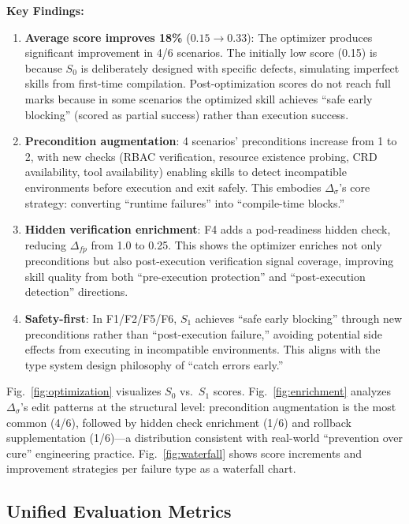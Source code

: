 \documentclass[conference,10pt]{IEEEtran}
\begin{document}
\noindent\textbf{Key Findings:}
\begin{enumerate}
  \item \textbf{Average score improves 18\%} ($0.15 \to 0.33$): The optimizer produces significant improvement in 4/6 scenarios.
  The initially low score (0.15) is because $S_0$ is deliberately designed with specific defects, simulating imperfect skills from first-time compilation.
  Post-optimization scores do not reach full marks because in some scenarios the optimized skill achieves ``safe early blocking'' (scored as partial success) rather than execution success.
  \item \textbf{Precondition augmentation}: 4 scenarios' preconditions increase from 1 to 2, with new checks (RBAC verification, resource existence probing, CRD availability, tool availability) enabling skills to detect incompatible environments before execution and exit safely.
  This embodies $\Delta_\sigma$'s core strategy: converting ``runtime failures'' into ``compile-time blocks.''
  \item \textbf{Hidden verification enrichment}: F4 adds a pod-readiness hidden check, reducing $\Delta_{fp}$ from 1.0 to 0.25.
  This shows the optimizer enriches not only preconditions but also post-execution verification signal coverage, improving skill quality from both ``pre-execution protection'' and ``post-execution detection'' directions.
  \item \textbf{Safety-first}: In F1/F2/F5/F6, $S_1$ achieves ``safe early blocking'' through new preconditions rather than ``post-execution failure,'' avoiding potential side effects from executing in incompatible environments.
  This aligns with the type system design philosophy of ``catch errors early.''
\end{enumerate}

Fig.~\ref{fig:optimization} visualizes $S_0$ vs.\ $S_1$ scores.
Fig.~\ref{fig:enrichment} analyzes $\Delta_\sigma$'s edit patterns at the structural level: precondition augmentation is the most common (4/6), followed by hidden check enrichment (1/6) and rollback supplementation (1/6)---a distribution consistent with real-world ``prevention over cure'' engineering practice.
Fig.~\ref{fig:waterfall} shows score increments and improvement strategies per failure type as a waterfall chart.

\subsection{Unified Evaluation Metrics}
\end{document}
